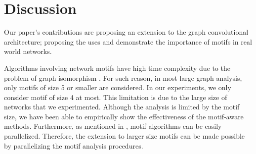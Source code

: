 \documentclass{article}
\theoremstyle{definition}
\begin{document}
\begin{table}
\centering
{}
\caption{Accuracy score for multi-class labeling}
\label{t:re}
\end{table}

\section{Discussion}

Our paper's contributions are proposing an extension to the graph convolutional 
architecture; proposing the uses and demonstrate the importance of motifs in
real world networks.

Algorithms involving network motifs have high time complexity due to
the problem of graph isomorphism \cite{motifdecrev}. 
For such reason, in most large graph
analysis, only motifs of size 5 or smaller are considered. In our 
experiments, we only consider motif of size 4 at most. This limitation is 
due to the large size of networks that we experimented. Although the
analysis is limited by the motif size, we have been able to empirically 
show the effectiveness of the motif-aware methods. Furthermore, as 
mentioned in \cite{juremotif}, motif algorithms can be easily 
parallelized. Therefore, the extension to larger size motifs can be made 
possible by parallelizing the motif analysis procedures.



\end{document}
